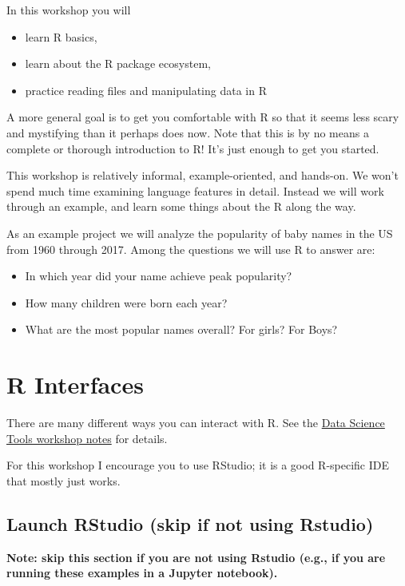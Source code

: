 \documentclass[]{book}
\providecommand{\tightlist}{%
  \setlength{\itemsep}{0pt}\setlength{\parskip}{0pt}}
\begin{document}
In this workshop you will

\begin{itemize}
\tightlist
\item
  learn R basics,
\item
  learn about the R package ecosystem,
\item
  practice reading files and manipulating data in R
\end{itemize}

A more general goal is to get you comfortable with R so that it seems
less scary and mystifying than it perhaps does now. Note that this is by
no means a complete or thorough introduction to R! It's just enough to
get you started.

This workshop is relatively informal, example-oriented, and hands-on. We
won't spend much time examining language features in detail. Instead we
will work through an example, and learn some things about the R along
the way.

As an example project we will analyze the popularity of baby names in
the US from 1960 through 2017. Among the questions we will use R to
answer are:

\begin{itemize}
\tightlist
\item
  In which year did your name achieve peak popularity?
\item
  How many children were born each year?
\item
  What are the most popular names overall? For girls? For Boys?
\end{itemize}

\section{R Interfaces}\label{r-interfaces}

There are many different ways you can interact with R. See the
\href{http://tutorials.iq.harvard.edu/DataScienceTools/DataScienceTools.html}{Data
Science Tools workshop notes} for details.

For this workshop I encourage you to use RStudio; it is a good
R-specific IDE that mostly just works.

\subsection{Launch RStudio (skip if not using
Rstudio)}\label{launch-rstudio-skip-if-not-using-rstudio}

\textbf{Note: skip this section if you are not using Rstudio (e.g., if
you are running these examples in a Jupyter notebook).}
\end{document}
